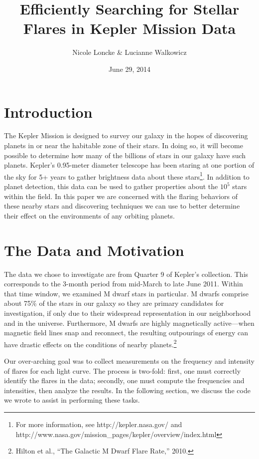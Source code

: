 \documentclass[11pt]{article}
\author{Nicole Loncke \& Lucianne Walkowicz}
\date{June 29, 2014}
\title{Efficiently Searching for Stellar Flares in Kepler Mission Data}
\begin{document}
\maketitle{}

\section{Introduction}
\label{sec:intro}
The Kepler Mission is designed to survey our galaxy in the hopes of
discovering planets in or near the habitable zone of their stars.  In
doing so, it will become possible to determine how many of the
billions of stars in our galaxy have such planets. Kepler's 0.95-meter
diameter telescope has been staring at one portion of the sky for 5+
years to gather brightness data about these stars\footnote{For more
  information, see http://kepler.nasa.gov/ and
  http://www.nasa.gov/mission\_pages/kepler/overview/index.html}.  In
addition to planet detection, this data can be used to gather
properties about the $10^5$ stars within the field.  In this paper we
are concerned with the flaring behaviors of these nearby stars and
discovering techniques we can use to better determine their effect on
the environments of any orbiting planets.

\section{The Data and Motivation}
\label{sec:data}
The data we chose to investigate are from Quarter 9 of Kepler's
collection.  This corresponds to the 3-month period from mid-March to
late June 2011.  Within that time window, we examined M dwarf stars in
particular.  M dwarfs comprise about 75\% of the stars in our galaxy
so they are primary candidates for investigation, if only due to their
widespread representation in our neighborhood and in the universe.
Furthermore, M dwarfs are highly magnetically active---when magnetic
field lines snap and reconnect, the resulting outpourings of energy
can have drastic effects on the conditions of nearby
planets.\footnote{Hilton et al., ``The Galactic M Dwarf Flare Rate,''
  2010.}

Our over-arching goal was to collect measurements on the frequency and
intensity of flares for each light curve.  The process is two-fold:
first, one must correctly identify the flares in the data; secondly,
one must compute the frequencies and intensities, then analyze the
results.  In the following section, we discuss the code we wrote to
assist in performing these tasks.
\end{document}

